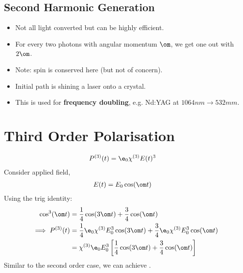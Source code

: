 \documentclass[a4paper, 11pt, normalem]{report}
\begin{document}
\subsection{Second Harmonic Generation}
\begin{figure}[H]
    \centering
\end{figure}
\begin{itemize}
    \item Not all light converted but can be highly efficient. 
    \item For every two photons with angular momentum $\om$, we get one out with $2\om$.
    \item Note: spin is  conserved here (but not of concern).
    \item Initial path is shining a laser onto a crystal. 
    \item This is used for \textbf{frequency doubling}, e.g. Nd:YAG at $1064nm\to532mm$.
\end{itemize}

\section{Third Order Polarisation}
\begin{align}
    P^{(3)}(t) &= \e_0\chi^{(3)}E(t)^3
\end{align}
Consider applied field,
\begin{align}
    E(t) &= E_0\cos(\om t)
\end{align}
Using the trig identity: 
\begin{align}
    \cos^3(\om t) &= \frac14\cos(3\om t) + \frac34\cos(\om t) \\
    \implies P^{(3)}(t) &= \frac14\e_0\chi^{(3)}E_0^3\cos(3\om t) + \frac34\e_0\chi^{(3)}E_0^3\cos(\om t) \\
                        &= \chi^{(3)}\e_0E_0^3\left[\frac14\cos(3\om t) + \frac34\cos(\om t)\right]
\end{align}
Similar to the second order case, we can achieve .
\end{document}
